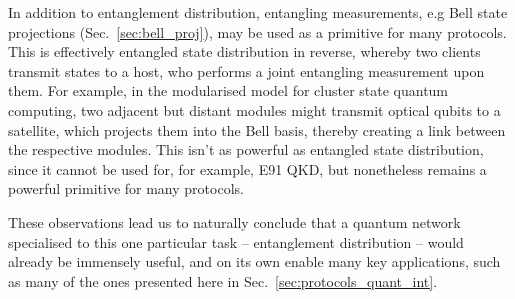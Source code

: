 
In addition to entanglement distribution, entangling measurements, e.g Bell state projections (Sec.~\ref{sec:bell_proj}), may be used as a primitive for many protocols. This is effectively entangled state distribution in reverse, whereby two clients transmit states to a host, who performs a joint entangling measurement upon them. For example, in the modularised model for cluster state quantum computing, two adjacent but distant modules might transmit optical qubits to a satellite, which projects them into the Bell basis, thereby creating a link between the respective modules. This isn't as powerful as entangled state distribution, since it cannot be used for, for example, E91 QKD, but nonetheless remains a powerful primitive for many protocols.

These observations lead us to naturally conclude that a quantum network specialised to this one particular task -- entanglement distribution -- would already be immensely useful, and on its own enable many key applications, such as many of the ones presented here in Sec.~\ref{sec:protocols_quant_int}.

